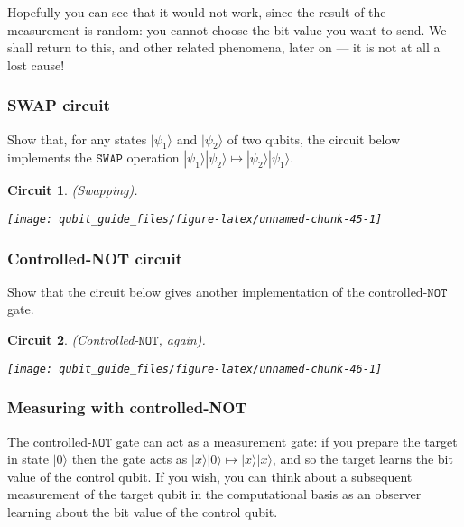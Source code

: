 \documentclass[fleqn]{article}
\newtheorem*{circuit}{Circuit}
\begin{document}
Hopefully you can see that it would not work, since the result of the measurement is random: you cannot choose the bit value you want to send.
We shall return to this, and other related phenomena, later on --- it is not at all a lost cause!

\hypertarget{swap-circuit}{%
\subsubsection{SWAP circuit}\label{swap-circuit}}

Show that, for any states \(|\psi_1\rangle\) and \(|\psi_2\rangle\) of two qubits, the circuit below implements the \(\texttt{SWAP}\) operation \(|\psi_1\rangle|\psi_2\rangle \mapsto |\psi_2\rangle|\psi_1\rangle\).

\begin{circuit}

(Swapping).

\begin{center}\texttt{[image: qubit\_guide\_files/figure-latex/unnamed-chunk-45-1]} \end{center}

\end{circuit}

\hypertarget{controlled-not-circuit}{%
\subsubsection{Controlled-NOT circuit}\label{controlled-not-circuit}}

Show that the circuit below gives another implementation of the controlled-\(\texttt{NOT}\) gate.

\begin{circuit}

(Controlled-\(\texttt{NOT}\), again).

\begin{center}\texttt{[image: qubit\_guide\_files/figure-latex/unnamed-chunk-46-1]} \end{center}

\end{circuit}

\hypertarget{measuring-with-controlled-not}{%
\subsubsection{Measuring with controlled-NOT}\label{measuring-with-controlled-not}}

The controlled-\(\texttt{NOT}\) gate can act as a measurement gate: if you prepare the target in state \(|0\rangle\) then the gate acts as \(|x\rangle|0\rangle\mapsto|x\rangle|x\rangle\), and so the target learns the bit value of the control qubit.
If you wish, you can think about a subsequent measurement of the target qubit in the computational basis as an observer learning about the bit value of the control qubit.
\end{document}
